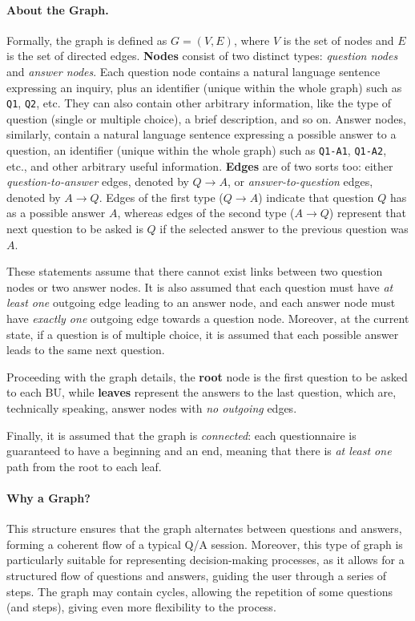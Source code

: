 \documentclass[12pt,a4paper,openright,twoside]{book}
\begin{document}
\paragraph{About the Graph.}
Formally, the graph is defined as $G = (V, E)$, where $V$ is the set of nodes and $E$ is the set of directed edges.
%
\textbf{Nodes} consist of two distinct types: \textit{question nodes} and \textit{answer nodes}.
%
Each question node contains a natural language sentence expressing an inquiry, plus an identifier (unique within the whole graph) such as \texttt{Q1}, \texttt{Q2}, etc.
%
They can also contain other arbitrary information, like the type of question (single or multiple choice), a brief description, and so on.
%
Answer nodes, similarly, contain a natural language sentence expressing a possible answer to a question, an identifier (unique within the whole graph) such as \texttt{Q1-A1}, \texttt{Q1-A2}, etc., and other arbitrary useful information.
%
\textbf{Edges} are of two sorts too: either \textit{question-to-answer} edges, denoted by $Q \to A$, or \textit{answer-to-question} edges, denoted by $A \to Q$.
%
Edges of the first type ($Q \to A$) indicate that question $Q$ has as a possible answer $A$, whereas edges of the second type ($A \to Q$) represent that next question to be asked is $Q$ if the selected answer to the previous question was $A$.

These statements assume that there cannot exist links between two question nodes or two answer nodes.
%
It is also assumed that each question must have \textit{at least one} outgoing edge leading to an answer node, and each answer node must have \textit{exactly one} outgoing edge towards a question node.
%
Moreover, at the current state, if a question is of multiple choice, it is assumed that each possible answer leads to the same next question.

Proceeding with the graph details, the \textbf{root} node is the first question to be asked to each \ac{BU}, while \textbf{leaves} represent the answers to the last question, which are, technically speaking, answer nodes with \textit{no outgoing} edges.

Finally, it is assumed that the graph is \textit{connected}: each questionnaire is guaranteed to have a beginning and an end, meaning that there is \textit{at least one} path from the root to each leaf.


\paragraph{Why a Graph?}
This structure ensures that the graph alternates between questions and answers, forming a coherent flow of a typical \ac{Q/A} session.
%
Moreover, this type of graph is particularly suitable for representing decision-making processes, as it allows for a structured flow of questions and answers, guiding the user through a series of steps.
%
The graph may contain cycles, allowing the repetition of some questions (and steps), giving even more flexibility to the process.
\end{document}
